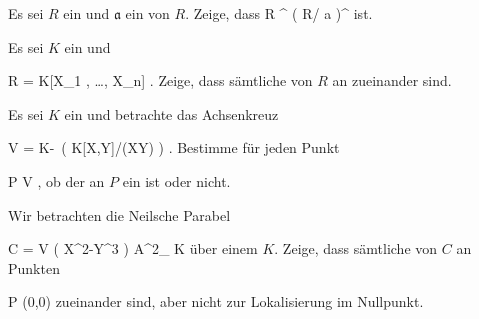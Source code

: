 {}
{





Es sei $R$ ein
und ${\mathfrak a}$ ein
von $R$. Zeige, dass
\maabbdisp {} { R ^{\times} } { \left(  R/ {\mathfrak a}   \right)^{\times}
} {}
ist.





}
{} {}

{}
{





Es sei $K$ ein
und

\mavergleichskette
{\vergleichskette
{ R
}
{ = }{ K[X_1 , \ldots , X_n]
}
{  }{
}
{    }{
}
{   }{
}
}
{}{}{.}
Zeige, dass sämtliche
von $R$ an
zueinander
sind.





}
{} {}

{}
{





Es sei $K$ ein
und betrachte das Achsenkreuz

\mavergleichskettedisp
{\vergleichskette
{V
}
{ =} { K\!-\!\, \left(  K[X,Y]/(XY)  \right)
}
{ } {
}
{ } {
}
{ } {
}
}
{}{}{.}
Bestimme für jeden Punkt

\mavergleichskette
{\vergleichskette
{P
}
{ \in }{ V
}
{  }{
}
{    }{
}
{   }{
}
}
{}{}{,}
ob der
an $P$ ein
ist oder nicht.





}
{} {}

{}
{





Wir betrachten die Neilsche Parabel

\mavergleichskettedisp
{\vergleichskette
{ C
}
{ =} { V \left(  X^2-Y^3  \right)
}
{ \subseteq} { {\mathbb A}^{2}_{ K }
}
{ } {
}
{ } {
}
}
{}{}{}
über einem
$K$. Zeige, dass sämtliche
von $C$ an Punkten

\mavergleichskette
{\vergleichskette
{ P
}
{ \neq }{ (0,0)
}
{  }{
}
{    }{
}
{   }{
}
}
{}{}{}
zueinander
sind, aber nicht zur Lokalisierung im Nullpunkt.





}
{} {}


